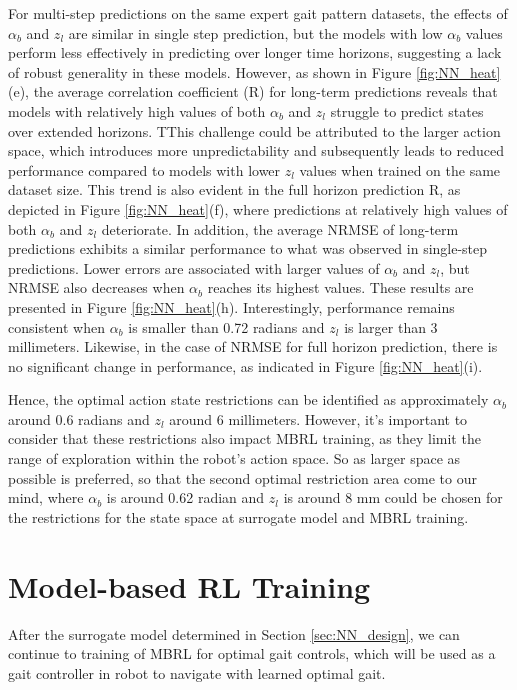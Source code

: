 For multi-step predictions on the same expert gait pattern datasets, the effects of $\alpha_b$ and $z_l$ are similar in single step prediction, but the models with low $\alpha_b$ values perform less effectively in predicting over longer time horizons, suggesting a lack of robust generality in these models. However, as shown in Figure \ref{fig:NN_heat}(e), the average correlation coefficient (R) for long-term predictions reveals that models with relatively high values of both $\alpha_b$ and $z_l$ struggle to predict states over extended horizons. TThis challenge could be attributed to the larger action space, which introduces more unpredictability and subsequently leads to reduced performance compared to models with lower $z_l$ values when trained on the same dataset size. This trend is also evident in the full horizon prediction R, as depicted in Figure \ref{fig:NN_heat}(f), where predictions at relatively high values of both $\alpha_b$ and $z_l$ deteriorate. In addition, the average NRMSE of long-term predictions exhibits a similar performance to what was observed in single-step predictions. Lower errors are associated with larger values of $\alpha_b$ and $z_l$, but NRMSE also decreases when $\alpha_b$ reaches its highest values. These results are presented in Figure \ref{fig:NN_heat}(h). Interestingly, performance remains consistent when $\alpha_b$ is smaller than 0.72 radians and $z_l$ is larger than 3 millimeters. Likewise, in the case of NRMSE for full horizon prediction, there is no significant change in performance, as indicated in Figure \ref{fig:NN_heat}(i).

Hence, the optimal action state restrictions can be identified as approximately $\alpha_b$ around 0.6 radians and $z_l$ around 6 millimeters. However, it's important to consider that these restrictions also impact MBRL training, as they limit the range of exploration within the robot's action space. So as larger space as possible is preferred, so that the second optimal restriction area come to our mind, where $\alpha_b$ is around 0.62 radian and $z_l$ is around 8 mm could be chosen for the restrictions for the state space at surrogate model and MBRL training.
\section{Model-based RL Training}
After the surrogate model determined in Section \ref{sec:NN_design}, we can continue to training of MBRL for optimal gait controls, which will be used as a gait controller in robot to navigate with learned optimal gait. 
